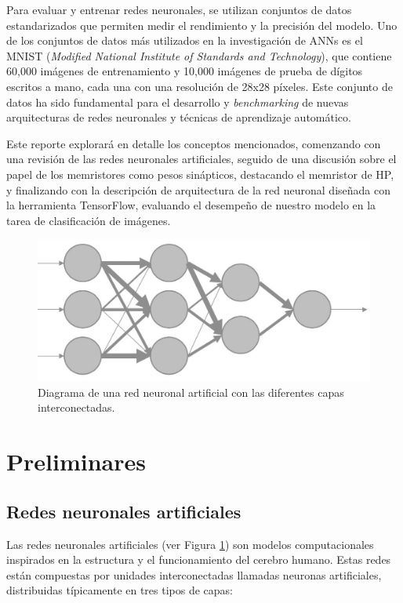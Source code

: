 \documentclass[conference]{IEEEtran}
\begin{document}
Para evaluar y entrenar redes neuronales, se utilizan conjuntos de datos estandarizados que permiten medir el rendimiento y la precisión del modelo. \cite{mem7} \cite{mem8}Uno de los conjuntos de datos más utilizados en la investigación de ANNs es el MNIST (\textit{Modified National Institute of Standards and Technology}), que contiene 60,000 imágenes de entrenamiento y 10,000 imágenes de prueba de dígitos escritos a mano, cada una con una resolución de 28x28 píxeles. Este conjunto de datos ha sido fundamental para el desarrollo y \textit{benchmarking} de nuevas arquitecturas de redes neuronales y técnicas de aprendizaje automático. \cite{mem9} \cite{mem10}

Este reporte explorará en detalle los conceptos mencionados, comenzando con una revisión de las redes neuronales artificiales, seguido de una discusión sobre el papel de los memristores como pesos sinápticos, destacando el memristor de HP, y finalizando con la descripción de arquitectura de la red neuronal diseñada con la herramienta TensorFlow, evaluando el desempeño de nuestro modelo en la tarea de clasificación de imágenes.

\begin{figure}[ht]
	\centering
	\includegraphics[scale=0.2]{img/ANN.png}
	\caption{Diagrama de una red neuronal artificial con las diferentes capas interconectadas.
		\label{fig:ann}}
\end{figure}

\section{Preliminares}

\subsection{Redes neuronales artificiales}
Las redes neuronales artificiales (ver Figura \ref{fig:ann}) son modelos computacionales inspirados en la estructura y el funcionamiento del cerebro humano. \cite{mem11} Estas redes están compuestas por unidades interconectadas llamadas neuronas artificiales, distribuidas típicamente en tres tipos de capas:
\end{document}
